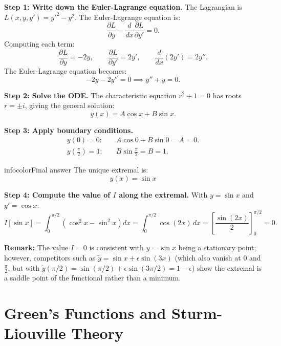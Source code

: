 \documentclass[a4paper,11pt]{article} %
\newenvironment{summarybox}[1][]{\begin{custombox}[#1]{infocolor}{Final answer}}{\end{custombox}}
\begin{document}
\textbf{Step 1: Write down the Euler-Lagrange equation.}
The Lagrangian is $L(x, y, y') = y'^2 - y^2$. The Euler-Lagrange equation is:
\[
    \frac{\partial L}{\partial y} - \frac{d}{dx}\frac{\partial L}{\partial y'} = 0.
\]
Computing each term:
\[
    \frac{\partial L}{\partial y} = -2y, \qquad \frac{\partial L}{\partial y'} = 2y', \qquad \frac{d}{dx}(2y') = 2y''.
\]
The Euler-Lagrange equation becomes:
\[
    -2y - 2y'' = 0 \implies y'' + y = 0.
\]

\textbf{Step 2: Solve the ODE.}
The characteristic equation $r^2 + 1 = 0$ has roots $r = \pm i$, giving the general solution:
\[
    y(x) = A\cos x + B\sin x.
\]

\textbf{Step 3: Apply boundary conditions.}
\begin{align*}
    y(0) = 0: &\quad A\cos 0 + B\sin 0 = A = 0. \\
    y\!\left(\tfrac{\pi}{2}\right) = 1: &\quad B\sin\!\tfrac{\pi}{2} = B = 1.
\end{align*}

\begin{summarybox}
The unique extremal is:
$$y(x) = \sin x$$
\end{summarybox}

\textbf{Step 4: Compute the value of $I$ along the extremal.}
With $y = \sin x$ and $y' = \cos x$:
\[
    I[\sin x] = \int_0^{\pi/2}\!\left(\cos^2 x - \sin^2 x\right)dx = \int_0^{\pi/2}\cos(2x)\,dx = \left[\frac{\sin(2x)}{2}\right]_0^{\pi/2} = 0.
\]

\textbf{Remark:} The value $I = 0$ is consistent with $y = \sin x$ being a stationary point; however, competitors such as $\tilde y = \sin x + \epsilon\sin(3x)$ (which also vanish at $0$ and $\frac{\pi}{2}$, but with $\tilde y(\pi/2) = \sin(\pi/2) + \epsilon\sin(3\pi/2) = 1 - \epsilon$) show the extremal is a saddle point of the functional rather than a minimum.

\newpage
\section{Green's Functions and Sturm-Liouville Theory}
\end{document}
